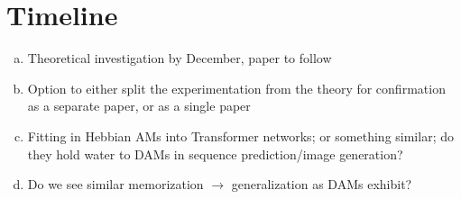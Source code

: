 \documentclass{article}
\theoremstyle{definition}
\begin{document}
\section{Timeline}

\begin{enumerate}[(a)]
    \item Theoretical investigation by December, paper to follow
    \item Option to either split the experimentation from the theory for confirmation as a separate
    paper, or as a single paper
    \item Fitting in Hebbian AMs into Transformer networks; or something similar; do they hold
    water to DAMs in sequence prediction/image generation?
    \item Do we see similar memorization $\to$ generalization as DAMs exhibit?
\end{enumerate}

\printbibliography
\end{document}
